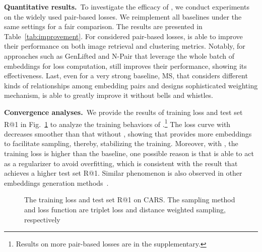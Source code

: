 \documentclass[runningheads]{llncs}
\begin{document}
\noindent\textbf{Quantitative results.}~To investigate the efficacy of \shortname, we conduct experiments  on the widely used pair-based losses. We reimplement all baselines under the same settings for a fair comparison. The results are presented in Table~\ref{tab:improvement}. For considered pair-based losses, \shortname is able to improve their performance on both image retrieval and clustering metrics. Notably, for approaches such as GenLifted and N-Pair that leverage the whole batch of embeddings for loss computation, \shortname still improves their performance, showing its effectiveness. Last, even for a very strong baseline, MS, that considers different kinds of relationships among embedding pairs and designs sophisticated weighting mechanism, \shortname is able to greatly improve it without bells and whistles.

\noindent\textbf{Convergence analyses.}~We provide the results of training loss and test set R@1 in Fig.~\ref{fig:training} to analyze the training behaviors of \shortname.\footnote{Results on more pair-based losses are in the supplementary.} The loss curve with \shortname decreases smoother than that without \shortname, showing that \shortname provides more embeddings to facilitate sampling, thereby, stabilizing the training. Moreover, with \shortname, the training loss is higher than the baseline, one possible reason is that \shortname is able to act as a regularizer to avoid overfitting, which is consistent with the result that \shortname achieves a higher test set R@1. Similar phenomenon is also observed in other embeddings generation methods~\cite{ko2020embedding}.

\begin{figure}
    \caption{The training loss and test set R@1 on CARS. The sampling method and loss function are triplet loss and distance weighted sampling, respectively\fullstop}
    \label{fig:training}
\end{figure}
\end{document}
